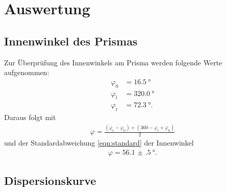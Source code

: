 \section{Auswertung}
\label{sec:Auswertung}

\subsection{Innenwinkel des Prismas}

Zur Überprüfung des Innenwinkels am Prisma werden folgende Werte aufgenommen:
\begin{align*}
  \varphi_0 & = \SI{16.5}{\degree} \\
  \varphi_\text{l} & = \SI{320.0}{\degree} \\
  \varphi_\text{r} & = \SI{72.3}{\degree}.
\end{align*}
Daraus folgt mit
\begin{align}
  \varphi = \frac{(\varphi_\text{r} - \varphi_0)+(360 - \varphi_{l} + \varphi_0)}{2}
\end{align}
und der Standardabweichung \eqref{eqn:standard}
der Innenwinkel
\begin{align}
  \varphi = \SI{56.1(5)}{\degree}.
\end{align}

\subsection{Dispersionskurve}

